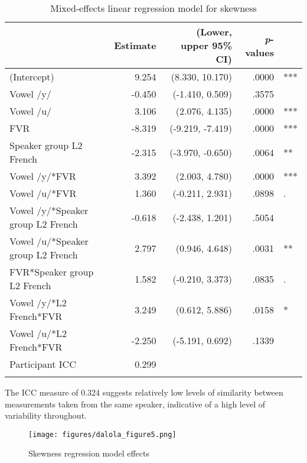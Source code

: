 \documentclass[output=paper,colorlinks,citecolor=brown,draftmode]{langscibook}
\begin{document}
\begin{table}
\caption{Mixed-effects linear regression model for skewness}
\small
\begin{tabularx}{\textwidth}{Qrrrl}
 \lsptoprule
   & \textbf{Estimate} & \textbf{(Lower, upper 95\% CI)} & \textbf{\emph{p}-values} &  \\ [0.5ex]
 \midrule
 (Intercept) & 9.254 & (8.330, 10.170) & .0000 & *** \\
 Vowel /y/ & -0.450 & (-1.410, 0.509) & .3575 & \\
 Vowel /u/ & 3.106 & (2.076, 4.135) & .0000 & *** \\
 FVR & -8.319 & (-9.219, -7.419) & .0000 & *** \\
 Speaker group L2 French & -2.315 & (-3.970, -0.650) & .0064 & ** \\
 Vowel /y/*FVR & 3.392 & (2.003, 4.780) & .0000 & *** \\
 Vowel /u/*FVR & 1.360 & (-0.211, 2.931) & .0898 & . \\
 Vowel /y/*Speaker group L2 French & -0.618 & (-2.438, 1.201) & .5054 & \\
 Vowel /u/*Speaker group L2 French & 2.797 & (0.946, 4.648) & .0031 & ** \\
 FVR*Speaker group L2 French & 1.582 & (-0.210, 3.373) & .0835 & . \\
 Vowel /y/*L2 French*FVR & 3.249 & (0.612, 5.886) & .0158 & * \\
 Vowel /u/*L2 French*FVR & -2.250 & (-5.191, 0.692) & .1339 & \\
\midrule
 Participant ICC & 0.299 & \\
\lspbottomrule
\end{tabularx}
\label{table:4}
\end{table}


The ICC measure of 0.324 suggests relatively low levels of similarity between measurements taken from the same speaker, indicative of a high level of variability throughout.

\begin{figure}
    \texttt{[image: figures/dalola\_figure5.png]}
    \caption{Skewness regression model effects}
    \label{figure5}
\end{figure}

\newpage
\end{document}

